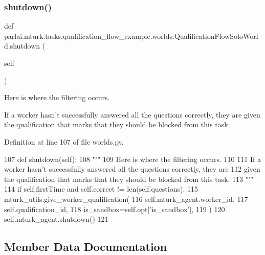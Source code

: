 \subsubsection{\texorpdfstring{shutdown()}{shutdown()}}
{\footnotesize\ttfamily def parlai.\+mturk.\+tasks.\+qualification\+\_\+flow\+\_\+example.\+worlds.\+Qualification\+Flow\+Solo\+World.\+shutdown (\begin{DoxyParamCaption}\item[{}]{self }\end{DoxyParamCaption})}

\begin{DoxyVerb}Here is where the filtering occurs.

If a worker hasn't successfully answered all the questions correctly, they are
given the qualification that marks that they should be blocked from this task.
\end{DoxyVerb}
 

Definition at line 107 of file worlds.\+py.


\begin{DoxyCode}
107     \textcolor{keyword}{def }shutdown(self):
108         \textcolor{stringliteral}{"""}
109 \textcolor{stringliteral}{        Here is where the filtering occurs.}
110 \textcolor{stringliteral}{}
111 \textcolor{stringliteral}{        If a worker hasn't successfully answered all the questions correctly, they are}
112 \textcolor{stringliteral}{        given the qualification that marks that they should be blocked from this task.}
113 \textcolor{stringliteral}{        """}
114         \textcolor{keywordflow}{if} self.firstTime \textcolor{keywordflow}{and} self.correct != len(self.questions):
115             mturk\_utils.give\_worker\_qualification(
116                 self.mturk\_agent.worker\_id,
117                 self.qualification\_id,
118                 is\_sandbox=self.opt[\textcolor{stringliteral}{'is\_sandbox'}],
119             )
120         self.mturk\_agent.shutdown()
121 
\end{DoxyCode}


\subsection{Member Data Documentation}
\mbox{\label{classparlai_1_1mturk_1_1tasks_1_1qualification__flow__example_1_1worlds_1_1QualificationFlowSoloWorld_a7f5156373be56e174904dc53487f122d}} 
